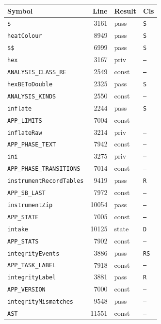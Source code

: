 {\begin{xltabular}{\linewidth}{|l|r|X|X|}
\hline \textbf{Symbol} & \textbf{Line} & \textbf{Result} & \textbf{Cls} \\ \hline\endhead
\texttt{\$} & 3161 & pass & \texttt{S} \\ \hline
\texttt{heatColour} & 8949 & pass & \texttt{S} \\ \hline
\texttt{\$\$} & 6999 & pass & \texttt{S} \\ \hline
\texttt{hex} & 3167 & priv & \texttt{--} \\ \hline
\texttt{ANALYSIS\_CLASS\_RE} & 2549 & const & \texttt{--} \\ \hline
\texttt{hexBEToDouble} & 2325 & pass & \texttt{S} \\ \hline
\texttt{ANALYSIS\_KINDS} & 2550 & const & \texttt{--} \\ \hline
\texttt{inflate} & 2244 & pass & \texttt{S} \\ \hline
\texttt{APP\_LIMITS} & 7004 & const & \texttt{--} \\ \hline
\texttt{inflateRaw} & 3214 & priv & \texttt{--} \\ \hline
\texttt{APP\_PHASE\_TEXT} & 7942 & const & \texttt{--} \\ \hline
\texttt{ini} & 3275 & priv & \texttt{--} \\ \hline
\texttt{APP\_PHASE\_TRANSITIONS} & 7014 & const & \texttt{--} \\ \hline
\texttt{instrumentRecordTables} & 9419 & pass & \texttt{R} \\ \hline
\texttt{APP\_SB\_LAST} & 7972 & const & \texttt{--} \\ \hline
\texttt{instrumentZip} & 10054 & pass & \texttt{--} \\ \hline
\texttt{APP\_STATE} & 7005 & const & \texttt{--} \\ \hline
\texttt{intake} & 10125 & state & \texttt{D} \\ \hline
\texttt{APP\_STATS} & 7902 & const & \texttt{--} \\ \hline
\texttt{integrityEvents} & 3886 & pass & \texttt{RS} \\ \hline
\texttt{APP\_TASK\_LABEL} & 7918 & const & \texttt{--} \\ \hline
\texttt{integrityLabel} & 3881 & pass & \texttt{R} \\ \hline
\texttt{APP\_VERSION} & 7000 & const & \texttt{--} \\ \hline
\texttt{integrityMismatches} & 9548 & pass & \texttt{--} \\ \hline
\texttt{AST} & 11551 & const & \texttt{--} \\ \hline

\end{xltabular}}
